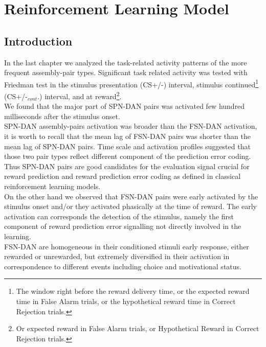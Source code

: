 \chapter{Reinforcement Learning Model}
\label{chap:RLModel}
\section{Introduction}
\label{sec:IntroRL}
In the last chapter we analyzed the task-related activity patterns of the more frequent assembly-pair types. Significant task related activity was tested with Friedman test in the stimulus presentation (CS+/-) interval, stimulus continued\footnote{The window right before the reward delivery time, or the expected reward time in False Alarm trials, or the hypothetical reward time in Correct Rejection trials.} (CS+/-$_{cont}$.) interval, and at reward\footnote{Or expected reward in False Alarm trials, or Hypothetical Reward in Correct Rejection trials.}.\\We found that the major part of SPN-DAN pairs was activated few hundred milliseconds after the stimulus onset.\\SPN-DAN assembly-pairs activation was broader than the FSN-DAN activation, it is worth to recall that the mean lag of FSN-DAN pairs was shorter than the mean lag of SPN-DAN pairs. Time scale and activation profiles suggested that those two pair types reflect different component of the prediction error coding. Thus SPN-DAN pairs are good candidates for the evaluation signal crucial for reward prediction and reward prediction error coding as defined in classical reinforcement learning models.\\On the other hand we observed that FSN-DAN pairs were early activated by the stimulus onset and/or they activated phasically at the time of reward. The early activation can corresponds the detection of the stimulus, namely the first component of reward prediction error signalling not directly involved in the learning.\\FSN-DAN are homogeneous in their conditioned stimuli early response, either rewarded or unrewarded, but extremely diversified in their activation in correspondence to different events including choice and motivational status.\\ %
